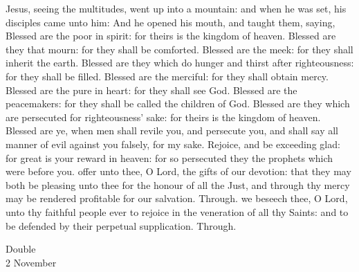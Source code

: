 

 Jesus, seeing the multitudes, went up into a mountain: and when he was set, his disciples came unto him: And he opened his mouth, and taught them, saying, Blessed are the poor in spirit: for theirs is the kingdom of heaven. Blessed are they that mourn: for they shall be comforted. Blessed are the meek: for they shall inherit the earth. Blessed are they which do hunger and thirst after righteousness: for they shall be filled. Blessed are the merciful: for they shall obtain mercy. Blessed are the pure in heart: for they shall see God. Blessed are the peacemakers: for they shall be called the children of God. Blessed are they which are persecuted for righteousness' sake: for theirs is the kingdom of heaven. Blessed are ye, when men shall revile you, and persecute you, and shall say all manner of evil against you falsely, for my sake. Rejoice, and be exceeding glad: for great is your reward in heaven: for so persecuted they the prophets which were before you.
\secret
{} offer unto thee, O Lord, the gifts of our devotion: that they may both be pleasing unto thee for the honour of all the Just, and through thy mercy may be rendered profitable for our salvation. Through.
\postcommunion
{} we beseech thee, O Lord, unto thy faithful people ever to rejoice in the veneration of all thy Saints: and to be defended by their perpetual supplication. Through.

\label{AllSouls}
\begin{inhead}
    {Double\\
2 November}
\end{inhead}

